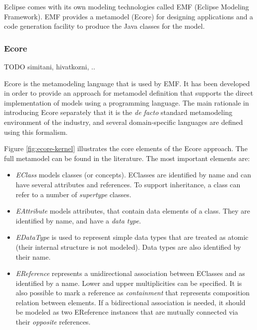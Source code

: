Eclipse comes with its own modeling technologies called EMF (Eclipse Modeling Framework). EMF provides a metamodel (Ecore) for designing applications and a code generation facility to produce the Java classes for the model.

\subsubsection{Ecore}
\label{ecore}

TODO simitani, hivatkozni, ..

Ecore is the metamodeling language that is used by EMF. It has been developed in order to provide an approach
for metamodel definition that supports the direct implementation of models using a programming language. 
The main rationale in introducing Ecore separately that it is the \emph{de facto}
standard metamodeling environment of the industry, and several domain-specific
languages are defined using this formalism.

 
 
 Figure \ref{fig:ecore-kernel} illustrates the core elements of the Ecore approach. The full metamodel can be found in the literature. The most important elements are:

\begin{itemize}
  \item \emph{EClass} models classes (or concepts). EClasses are identified by
  name and can have several attributes and references. To support inheritance,
  a class can refer to a number of \emph{supertype} classes.
  \item \emph{EAttribute} models attributes, that contain data elements of a
  class. They are identified by name, and have a \emph{data type}.
  \item \emph{EDataType} is used to represent simple data types that are
  treated as atomic (their internal structure is not modeled). Data types are
  also identified by their name.
  \item \emph{EReference} represents a unidirectional association between
  EClasses and as identified by a name. Lower and upper multiplicities can be 
  specified. It is also possible to mark a reference as \emph{containment} that
  represents composition relation between elements. If a bidirectional
  association is needed, it should be modeled as two EReference instances
  that are mutually connected via their \emph{opposite} references.
\end{itemize}


